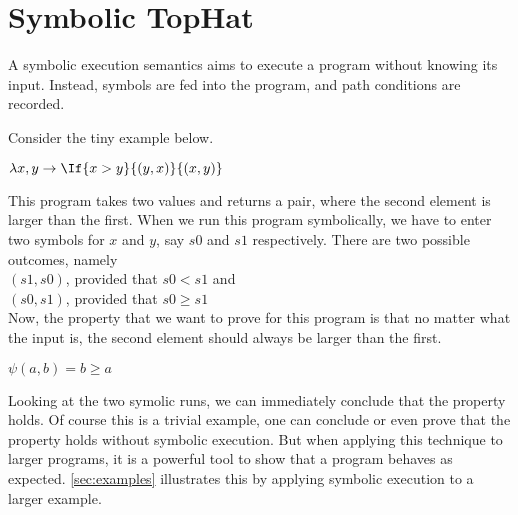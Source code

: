 
\section{Symbolic TopHat}
\label{sec:symbolic}

A symbolic execution semantics aims to execute a program without knowing its input.
Instead, symbols are fed into the program, and path conditions are recorded.

Consider the tiny example below.

\begin{TASK}
  $\lambda x,y \rightarrow \If{x>y}{(y,x)}{(x,y)}$
\end{TASK}

This program takes two values and returns a pair, where the second element is larger than the first.
When we run this program symbolically, we have to enter two symbols for $x$ and $y$, say $s0$ and $s1$ respectively.
There are two possible outcomes, namely\\
$(s1,s0)$, provided that $s0<s1$ and\\
$(s0,s1)$, provided that $s0\geq s1$\\

Now, the property that we want to prove for this program is that no matter what the input is, the second element should always be larger than the first.

$\psi(a,b)=b\geq a$

Looking at the two symolic runs, we can immediately conclude that the property holds.
Of course this is a trivial example, one can conclude or even prove that the property holds without symbolic execution.
But when applying this technique to larger programs, it is a powerful tool to show that a program behaves as expected.
\cref{sec:examples} illustrates this by applying symbolic execution to a larger example.




